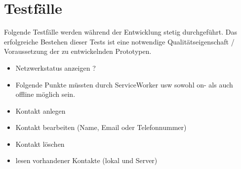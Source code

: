 \section{Testfälle}
Folgende Testfälle werden während der Entwicklung stetig durchgeführt. Das erfolgreiche Bestehen dieser Tests ist eine notwendige Qualitätseigenschaft / Voraussetzung der zu entwickelnden Prototypen.
\begin{itemize}
  	\item Netzwerkstatus anzeigen ? 
    \item Folgende Punkte müssten durch ServiceWorker usw sowohl on- als auch offline möglich sein. 
    \item Kontakt anlegen 
    \item Kontakt bearbeiten (Name, Email oder Telefonnummer)
    \item Kontakt löschen 
    \item lesen vorhandener Kontakte (lokal und Server)
\end{itemize}
%
%

